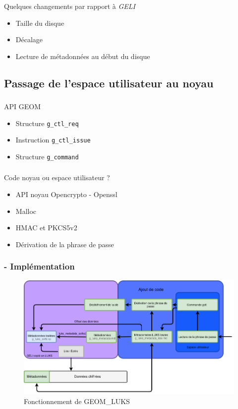 \begin{frame}
	\frametitle{\insertsubsectionhead}
	\begin{block}{Quelques changements par rapport à \textit{GELI}}
		\begin{itemize}
			\item Taille du disque
				\pause
			\item Décalage
				\pause
			\item Lecture de métadonnées au début du disque
		\end{itemize}
	\end{block}
\end{frame}

\subsection{Passage de l'espace utilisateur au noyau}

\begin{frame}
	\frametitle{\insertsubsectionhead}
	\begin{block}{API GEOM}
		\begin{itemize}
			\item Structure \texttt{g\_ctl\_req}
			\item Instruction \texttt{g\_ctl\_issue}
			\item Structure \texttt{g\_command}
		\end{itemize}
	\end{block}
\end{frame}

\begin{frame}
	\frametitle{\insertsubsectionhead}
	\begin{block}{Code noyau ou espace utilisateur ?}
		\begin{itemize}
			\item API noyau Opencrypto - Openssl
			\item Malloc
			\item HMAC et PKCS5v2
			\item Dérivation de la phrase de passe
		\end{itemize}
	\end{block}
\end{frame}

\begin{frame}
	\frametitle{\insertsubsectionhead - Implémentation}
	\begin{figure}
		\includegraphics[width=\textwidth]{developpement/utilisation_metadonnee_luks_2}
		\caption{Fonctionnement de GEOM\_LUKS}
	\end{figure}
\end{frame}
